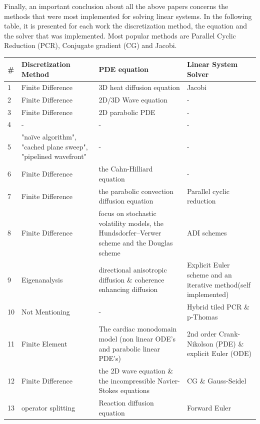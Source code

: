 Finally, an important conclusion about all the above papers concerns the methods that were most implemented for solving linear systems. In the following table, it is presented for each work the discretization method, the equation and the solver that was implemented. Most popular methods are Parallel Cyclic Reduction (PCR), Conjugate gradient (CG) and Jacobi. 

\begin{table}[t]
    \begin{center}
        \begin{tabular}{| l | p{4cm} | p{6cm} | p{6cm} |}
        \hline
        \#	& Discretization Method	& PDE equation 			 & Linear System Solver \\ \hline
        1	& Finite Difference	& 3D heat diffusion equation &	Jacobi \\ \hline
        2	& Finite Difference & 2D/3D Wave equation   	 &	- \\ \hline
        3	& Finite Difference	& 2D parabolic PDE	    	 & -  \\ \hline
        4	& -				    &	-						 & - \\ \hline
        5	&"naïve algorithm", "cached plane sweep", "pipelined wavefront" &	-	&- \\ \hline
        6	& Finite Difference	& the Cahn-Hilliard equation	& - \\ \hline
        7	& Finite Difference & the parabolic convection diffusion equation 	&Parallel cyclic reduction \\ \hline
        8	& Finite Difference	& focus on stochastic volatility models, the Hundsdorfer–Verwer scheme and the Douglas scheme	& ADI schemes \\ \hline
        9	& Eigenanalysis	& directional anisotropic diffusion \& coherence enhancing diffusion &	Explicit Euler scheme and an iterative method(self implemented) \\ \hline
        10	& Not Mentioning & -	& Hybrid tiled PCR \& p-Thomas  \\ \hline
        11	& Finite Element & The cardiac monodomain model (non linear ODE's and parabolic linear PDE's) &	2nd order Crank-Nikolson (PDE) \& explicit Euler (ODE)  \\ \hline
        12  & Finite Difference & the 2D wave equation \& the incompressible Navier-Stokes equations &	CG \& Gauss-Seidel\\ \hline
       13	& operator splitting	& Reaction diffusion equation	& Forward Euler \\ \hline

\end{tabular}
\end{center}
\end{table}
